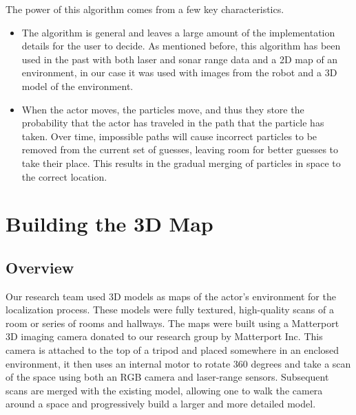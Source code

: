 \documentclass[a4paper,11pt]{article}
\begin{document}
 The power of this algorithm comes from a few key characteristics. 
\begin{itemize}
 \item The algorithm is general and leaves a large amount of the implementation details for the user to decide. As mentioned before, this algorithm has been used in the past with both laser and sonar range data and a 2D map of an environment, in our case it was used with images from the robot and a 3D model of the environment. 
 \item When the actor moves, the particles move, and thus they store the probability that the actor has traveled in the path that the particle has taken. Over time, impossible paths will cause incorrect particles to be removed from the current set of guesses, leaving room for better guesses to take their place. This results in the gradual merging of particles in space to the correct location.
\end{itemize}















  \section{Building the 3D Map}
   \subsection{Overview}
  Our research team used 3D models as maps of the actor's environment for the localization process. These models were fully textured, high-quality scans of a room or series of rooms and hallways. The maps were built using a Matterport 3D imaging camera donated to our research group by Matterport Inc. This camera is attached to the top of a tripod and placed somewhere in an enclosed environment, it then uses an internal motor to rotate 360 degrees and take a scan of the space using both an RGB camera and laser-range sensors. Subsequent scans are merged with the existing model, allowing one to walk the camera around a space and progressively build a larger and more detailed model.
\end{document}
